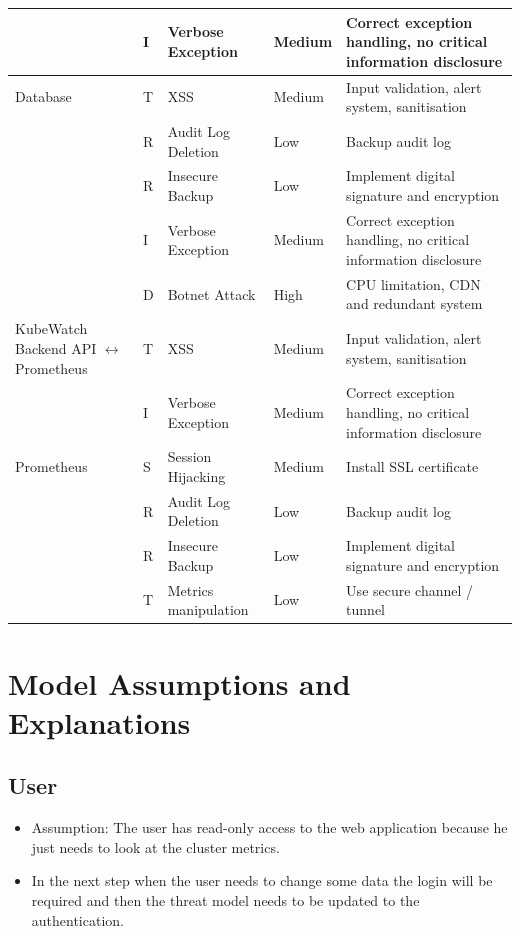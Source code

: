 \begin{longtable}[h!]{p{2.1cm} p{1.8cm} p{3cm} p{2cm} p{3.5cm}}
                        & I & Verbose Exception & Medium & Correct exception handling, no critical information disclosure \\
    \hline
    Database            & T & XSS & Medium & Input validation, alert system, sanitisation \\
                        & R & Audit Log Deletion & Low & Backup audit log \\
                        & R & Insecure Backup & Low & Implement digital signature and encryption \\
                        & I & Verbose Exception & Medium & Correct exception handling, no critical information disclosure \\
                        & D & Botnet Attack & High & CPU limitation, CDN and redundant system \\
    \hline
    KubeWatch Backend API \(\leftrightarrow\) Prometheus
                        & T & XSS & Medium & Input validation, alert system, sanitisation \\
                        & I & Verbose Exception & Medium & Correct exception handling, no critical information disclosure \\
    \hline
    Prometheus          & S & Session Hijacking & Medium & Install SSL certificate \\
                        & R & Audit Log Deletion & Low & Backup audit log \\
                        & R & Insecure Backup & Low & Implement digital signature and encryption \\
                        & T & Metrics manipulation & Low & Use secure channel / tunnel \\
    \hline
\end{longtable}


\section{Model Assumptions and Explanations}

\subsection{User}
\begin{itemize}
    \item Assumption: The user has read-only access to the web application because he just needs to look at the cluster metrics.
    \item In the next step when the user needs to change some data the login will be required and then the threat model needs to be updated to the authentication.
\end{itemize}



